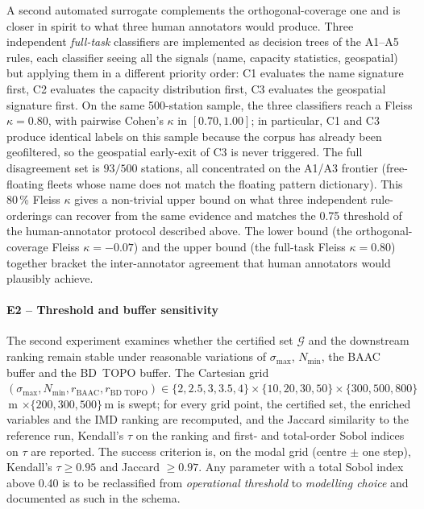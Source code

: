 \documentclass[a4paper,twoside]{article}
\begin{document}
A second automated surrogate complements the orthogonal-coverage
one and is closer in spirit to what three human annotators would
produce. Three independent \emph{full-task} classifiers are
implemented as decision trees of the A1--A5 rules, each
classifier seeing all the signals (name, capacity statistics,
geospatial) but applying them in a different priority order:
C1 evaluates the name signature first, C2 evaluates the capacity
distribution first, C3 evaluates the geospatial signature first.
On the same 500-station sample, the three classifiers reach a
Fleiss $\kappa = 0.80$, with pairwise Cohen's $\kappa$ in
$[0.70, 1.00]$; in particular, C1 and C3 produce identical labels
on this sample because the corpus has already been geofiltered,
so the geospatial early-exit of C3 is never triggered. The full
disagreement set is $93 / 500$ stations, all concentrated on the
A1/A3 frontier (free-floating fleets whose name does not match
the floating pattern dictionary). This 80\,\% Fleiss $\kappa$
gives a non-trivial upper bound on what three independent
rule-orderings can recover from the same evidence and matches the
0.75 threshold of the human-annotator protocol described above.
The lower bound (the orthogonal-coverage Fleiss $\kappa = -0.07$)
and the upper bound (the full-task Fleiss $\kappa = 0.80$)
together bracket the inter-annotator agreement that human
annotators would plausibly achieve.

\paragraph{E2 -- Threshold and buffer sensitivity}
The second experiment examines whether the certified set
$\mathcal{G}$ and the downstream ranking remain stable under
reasonable variations of $\sigma_{\max}$, $N_{\min}$, the BAAC
buffer and the BD~TOPO buffer. The Cartesian grid
$(\sigma_{\max}, N_{\min}, r_{\text{BAAC}}, r_{\text{BD~TOPO}})
\in \{2,2.5,3,3.5,4\}
\times \{10,20,30,50\}
\times \{300,500,800\}$\,m
$\times \{200,300,500\}$\,m
is swept; for every grid point, the certified set, the enriched
variables and the IMD ranking are recomputed, and the Jaccard
similarity to the reference run, Kendall's $\tau$ on the ranking
and first- and total-order Sobol indices on $\tau$ are reported.
The success criterion is, on the modal grid (centre $\pm$ one
step), Kendall's $\tau \ge 0.95$ and Jaccard $\ge 0.97$. Any
parameter with a total Sobol index above 0.40 is to be
reclassified from \emph{operational threshold} to
\emph{modelling choice} and documented as such in the schema.
\end{document}
